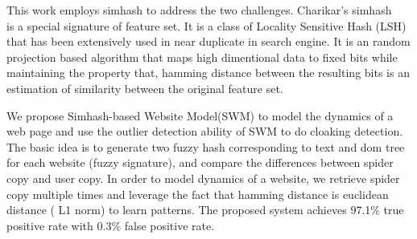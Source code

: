 
This work employs simhash to address the two challenges.
Charikar's simhash ~\cite{charikar2002similarity} is a special signature of feature set. 
It is a class of Locality Sensitive Hash (LSH) that has been extensively used in
near duplicate in search engine.
It is an random projection based algorithm that maps high dimentional data to fixed bits while
maintaining the property that, hamming distance between the resulting bits is an
estimation of similarity between the original feature set.

%
We propose Simhash-based Website Model(SWM) to model the dynamics of a
web page and use the outlier detection ability of SWM to do cloaking detection.
The basic idea is to generate two fuzzy hash corresponding to text and dom tree
for each website (fuzzy signature), and compare the differences between spider copy and user copy.
In order to model dynamics of a website, we retrieve spider copy multiple
times and leverage the fact that hamming distance is euclidean distance (
L1 norm) to learn patterns.
The proposed system achieves 97.1\% true positive rate with
0.3\% false positive rate.

